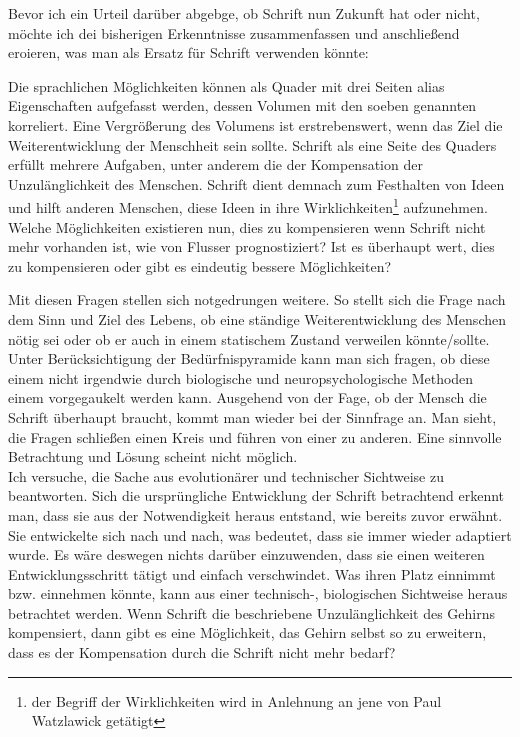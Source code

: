 \documentclass[12pt,a4paper,oneside]{article}
\begin{document}
  Bevor ich ein Urteil darüber abgebge, ob Schrift nun Zukunft hat oder nicht, möchte ich dei bisherigen Erkenntnisse zusammenfassen und anschließend eroieren, was man als Ersatz für Schrift verwenden könnte:
  
  Die sprachlichen Möglichkeiten können als Quader mit drei Seiten alias Eigenschaften aufgefasst werden, dessen Volumen mit den soeben genannten korreliert. Eine Vergrößerung des Volumens ist erstrebenswert, wenn das Ziel die Weiterentwicklung der Menschheit sein sollte. Schrift als eine Seite des Quaders erfüllt mehrere Aufgaben, unter anderem die der Kompensation der Unzulänglichkeit des Menschen. Schrift dient demnach zum Festhalten von Ideen und hilft anderen Menschen, diese Ideen in ihre Wirklichkeiten\footnote{der Begriff der Wirklichkeiten wird in Anlehnung an jene von Paul Watzlawick getätigt} aufzunehmen. Welche Möglichkeiten existieren nun, dies zu kompensieren wenn Schrift nicht mehr vorhanden ist, wie von Flusser prognostiziert? Ist es überhaupt wert, dies zu kompensieren oder gibt es eindeutig bessere Möglichkeiten?
  
  Mit diesen Fragen stellen sich notgedrungen weitere. So stellt sich die Frage nach dem Sinn und Ziel des Lebens, ob eine ständige Weiterentwicklung des Menschen nötig sei oder ob er auch in einem statischem Zustand verweilen könnte/sollte. Unter Berücksichtigung der Bedürfnispyramide kann man sich fragen, ob diese einem nicht irgendwie durch biologische und neuropsychologische Methoden einem vorgegaukelt werden kann. Ausgehend von der Fage, ob der Mensch die Schrift überhaupt braucht, kommt man wieder bei der Sinnfrage an. Man sieht, die Fragen schließen einen Kreis und führen von einer zu anderen. Eine sinnvolle Betrachtung und Lösung scheint nicht möglich.\\
  
  Ich versuche, die Sache aus evolutionärer und technischer Sichtweise zu beantworten. Sich die ursprüngliche Entwicklung der Schrift betrachtend erkennt man, dass sie aus der Notwendigkeit heraus entstand, wie bereits zuvor erwähnt. Sie entwickelte sich nach und nach, was bedeutet, dass sie immer wieder adaptiert wurde. Es wäre deswegen nichts darüber einzuwenden, dass sie einen weiteren Entwicklungsschritt tätigt und einfach verschwindet. Was ihren Platz einnimmt bzw. einnehmen könnte, kann aus einer technisch-, biologischen Sichtweise heraus betrachtet werden. Wenn Schrift die beschriebene Unzulänglichkeit des Gehirns kompensiert, dann gibt es eine Möglichkeit, das Gehirn selbst so zu erweitern, dass es der Kompensation durch die Schrift nicht mehr bedarf?
  
\end{document}
